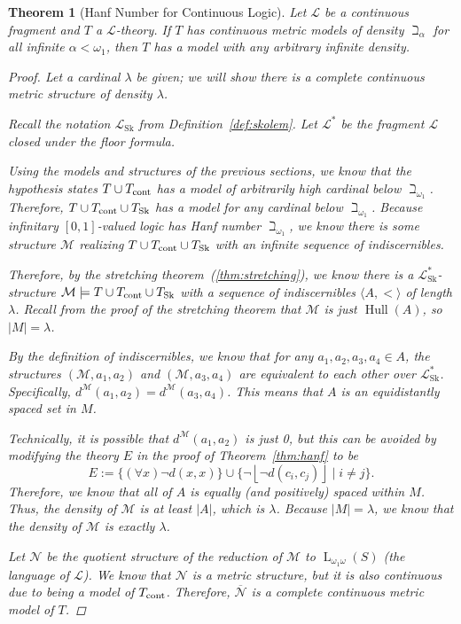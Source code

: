 \documentclass{amsart}
\newtheorem{theorem}{Theorem}[section]
\theoremstyle{definition}
\numberwithin{equation}{theorem}
\newcommand{\where}{\mid}
\newcommand{\strict}[1]{{\left\lfloor#1\right\rfloor}}
\newcommand{\baselang}{\operatorname{L}}
\newcommand{\lang}{\baselang_{\omega_1\omega}}
\newcommand{\Tskolem}{{T_{\operatorname{Sk}}}}
\newcommand{\frag}{\mathcal{L}}
\newcommand{\fragsk}{\frag_{\operatorname{Sk}}}
\newcommand{\hull}{\operatorname{Hull}}
\begin{document}
\begin{theorem}[Hanf Number for Continuous Logic]\label{thm:hanf-continuous}
  Let $\frag$ be a continuous fragment and $T$ a $\frag$-theory.
  If $T$ has continuous metric models of density $\beth_\alpha$ for all infinite $\alpha<\omega_1$, then $T$ has a model with any arbitrary infinite density.
  \begin{proof}
    Let a cardinal $\lambda$ be given; we will show there is a complete continuous metric structure of density $\lambda$.
  
    Recall the notation $\fragsk$ from Definition~\ref{def:skolem}.
    Let $\frag^*$ be the fragment $\frag$ closed under the floor formula.
    
    Using the models and structures of the previous sections, we know that the hypothesis states $T\cup {T_\text{cont}}$ has a model of arbitrarily high cardinal below $\beth_{\omega_1}$.
    Therefore, $T\cup\Tcont\cup\Tskolem$ has a model for any cardinal below $\beth_{\omega_1}$.
    Because infinitary $[0,1]$-valued logic has Hanf number $\beth_{\omega_1}$, we know there is some structure $\mathcal M$ realizing $T\cup\Tcont\cup\Tskolem$ with an infinite sequence of indiscernibles.
    
    Therefore, by the stretching theorem~(\ref{thm:stretching}), we know there is a $\fragsk^*$-structure $\mathcal M\models T\cup\Tcont\cup\Tskolem$ with a sequence of indiscernibles $\langle A,<\rangle$ of length $\lambda$.
    Recall from the proof of the stretching theorem that $\mathcal M$ is just $\hull(A)$, so $|M|=\lambda$.

    By the definition of indiscernibles, we know that for any $a_1,a_2,a_3,a_4\in A$, the structures $(\mathcal M, a_1, a_2)$ and $(\mathcal M, a_3, a_4)$ are equivalent to each other over $\fragsk^*$.
    Specifically, $d^\mathcal M(a_1,a_2)=d^\mathcal M(a_3,a_4)$.
    This means that $A$ is an equidistantly spaced set in $M$.
    
    Technically, it is possible that $d^\mathcal M(a_1,a_2)$ is just 0, but this can be avoided by modifying the theory $E$ in the proof of Theorem~\ref{thm:hanf} to be
    \[
      E:=\{(\forall x)\neg d(x, x)\}\cup\{\neg\strict{\neg d(c_i, c_j)}\where i\neq j\}.
    \]
    Therefore, we know that all of $A$ is equally (and positively) spaced within $M$.
    Thus, the density of $\mathcal M$ is at least $|A|$, which is $\lambda$.
    Because $|M|=\lambda$, we know that the density of $\mathcal M$ is exactly $\lambda$.
    
    Let $\mathcal N$ be the quotient structure of the reduction of $\mathcal M$ to $\lang(S)$ (the language of $\frag$).
    We know that $\mathcal N$ is a metric structure, but it is also continuous due to being a model of ${T_\text{cont}}$.
    Therefore, $\overline{\mathcal N}$ is a complete continuous metric model of $T$.
  \end{proof}
\end{theorem}
\end{document}
